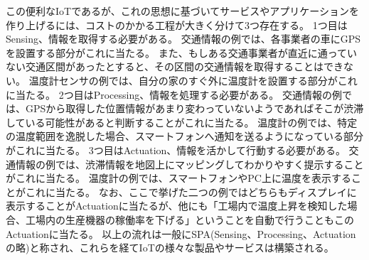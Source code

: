 この便利なIoTであるが、これの思想に基づいてサービスやアプリケーションを作り上げるには、コストのかかる工程が大きく分けて3つ存在する。
1つ目はSensing、情報を取得する必要がある。
交通情報の例では、各事業者の車にGPSを設置する部分がこれに当たる。
また、もしある交通事業者が直近に通っていない交通区間があったとすると、その区間の交通情報を取得することはできない。
温度計センサの例では、自分の家のすぐ外に温度計を設置する部分がこれに当たる。
2つ目はProcessing、情報を処理する必要がある。
交通情報の例では、GPSから取得した位置情報があまり変わっていないようであればそこが渋滞している可能性があると判断することがこれに当たる。
温度計の例では、特定の温度範囲を逸脱した場合、スマートフォンへ通知を送るようになっている部分がこれに当たる。
3つ目はActuation、情報を活かして行動する必要がある。
交通情報の例では、渋滞情報を地図上にマッピングしてわかりやすく提示することがこれに当たる。
温度計の例では、スマートフォンやPC上に温度を表示することがこれに当たる。
なお、ここで挙げた二つの例ではどちらもディスプレイに表示することがActuationに当たるが、他にも「工場内で温度上昇を検知した場合、工場内の生産機器の稼働率を下げる」ということを自動で行うこともこのActuationに当たる。
以上の流れは一般にSPA(Sensing、Processing、Actuationの略)と称され、これらを経てIoTの様々な製品やサービスは構築される。


